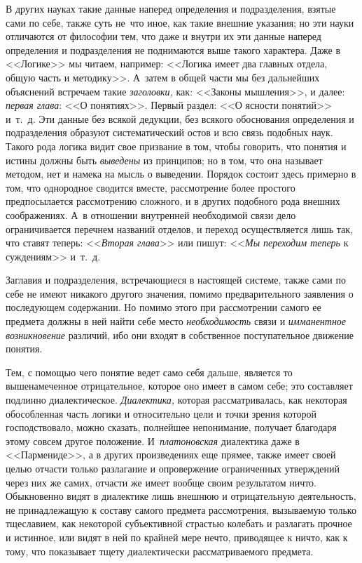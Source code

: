 В других науках такие данные наперед определения и подразделения, взятые
сами по себе, также суть не~что иное, как такие внешние указания; но эти
науки отличаются от философии тем, что даже и внутри их эти данные наперед
определения и подразделения не поднимаются выше такого характера. Даже в
<<Логике>> мы читаем, например: <<Логика имеет два главных отдела, общую часть
и методику>>. А~затем в общей части мы без дальнейших объяснений встречаем
такие {\em заголовки,} как: <<Законы мышления>>, и далее:
{\em первая глава}: <<О понятиях>>. Первый раздел: <<О
ясности понятий>> и~т.~д. Эти данные без всякой дедукции, без всякого
обоснования определения и подразделения образуют систематический остов и
всю связь подобных наук. Такого рода логика видит свое призвание в том,
чтобы говорить, что понятия и истины должны быть
{\em выведены} из принципов; но в том, что она называет
методом, нет и намека на мысль о выведении. Порядок состоит здесь примерно
в том, что однородное сводится вместе, рассмотрение более простого
предпосылается рассмотрению сложного, и в других подобного рода внешних
соображениях. А~в отношении внутренней необходимой связи дело
ограничивается перечнем названий отделов, и переход осуществляется лишь
так, что ставят теперь: <<{\em Вторая глава}>> или пишут:
<<{\em Мы переходим теперь} к суждениям>> и~т.~д.

Заглавия и подразделения, встречающиеся в настоящей системе, также сами по
себе не имеют никакого другого значения, помимо предварительного заявления
о последующем содержании. Но помимо этого при рассмотрении самого ее
предмета должны в ней найти себе место {\em необходимость} связи и
{\em имманентное возникновение} различий, ибо они
входят в собственное поступательное движение понятия.

Тем, с помощью чего понятие ведет само себя дальше, является то
вышенамеченное отрицательное, которое оно имеет в самом себе; это
составляет подлинно диалектическое. {\em Диалектика,}
которая рассматривалась, как некоторая обособленная часть логики и
относительно цели и точки зрения которой господствовало, можно сказать,
полнейшее непонимание, получает благодаря этому совсем другое положение.
И~{\em платоновская} диалектика даже в <<Пармениде>>, а в
других произведениях еще прямее, также имеет своей целью отчасти только
разлагание и опровержение ограниченных утверждений через них же самих,
отчасти же имеет вообще своим результатом ничто. Обыкновенно видят в
диалектике лишь внешнюю и отрицательную деятельность, не принадлежащую к
составу
самого предмета рассмотрения, вызываемую только тщеславием, как некоторой
субъективной страстью колебать и разлагать прочное и истинное, или видят в
ней по крайней мере нечто, приводящее к ничто, как к тому, что показывает
тщету диалектически рассматриваемого предмета.

